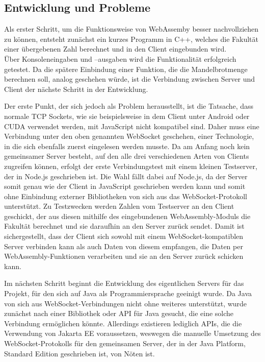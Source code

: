 \documentclass[12pt, onecolumn, notitlepage]{scrartcl}
\begin{document}
\subsection{Entwicklung und Probleme}
Als erster Schritt, um die Funktionsweise von WebAssemby  besser nachvollziehen zu können, entsteht zunächst ein kurzes Programm in C++, welches die Fakultät einer übergebenen Zahl berechnet und in den Client eingebunden wird. \\
Über Konsoleneingaben und –ausgaben wird die Funktionalität erfolgreich getestet. Da die spätere Einbindung einer Funktion, die die Mandelbrotmenge berechnen soll, analog geschehen würde, ist die Verbindung zwischen Server und Client der nächste Schritt in der Entwicklung. \par

Der erste Punkt, der sich jedoch als Problem herausstellt, ist die Tatsache, dass normale TCP Sockets, wie sie beispielsweise in dem Client unter Android oder CUDA verwendet werden, mit JavaScript nicht kompatibel sind. Daher muss eine Verbindung unter den oben genannten WebSocket geschehen, einer Technologie, in die sich ebenfalls zuerst eingelesen werden musste. Da am Anfang noch kein gemeinsamer Server besteht, auf den alle drei verschiedenen Arten von Clients zugreifen können, erfolgt der erste Verbindungstest mit einem kleinen Testserver, der in Node.js geschrieben ist. Die Wahl fällt dabei auf Node.js, da der Server somit genau wie der Client in JavaScript geschrieben werden kann und somit ohne Einbindung externer Bibliotheken von sich aus das WebSocket-Protokoll unterstützt. Zu Testzwecken werden Zahlen vom Testserver an den Client geschickt, der aus diesen mithilfe des eingebundenen WebAssembly-Moduls die Fakultät berechnet und sie daraufhin an den Server zurück sendet. Damit ist sichergestellt, dass der Client sich sowohl mit einem WebSocket-kompatiblen Server verbinden kann als auch Daten von diesem empfangen, die Daten per WebAssembly-Funktionen verarbeiten und sie an den Server zurück schicken kann. \par

Im nächsten Schritt beginnt die Entwicklung des eigentlichen Servers für das Projekt, für den sich auf Java als Programmiersprache geeinigt wurde. Da Java von sich aus WebSocket-Verbindungen nicht ohne weiteres unterstützt, wurde zunächst nach einer Bibliothek oder API für Java gesucht, die eine solche Verbindung ermöglichen könnte. Allerdings existieren lediglich APIs, die die Verwendung von Jakarta EE voraussetzen, weswegen die manuelle Umsetzung des WebSocket-Protokolls für den gemeinsamen Server, der in der Java Platform, Standard Edition geschrieben ist, von Nöten ist. \par
\end{document}
